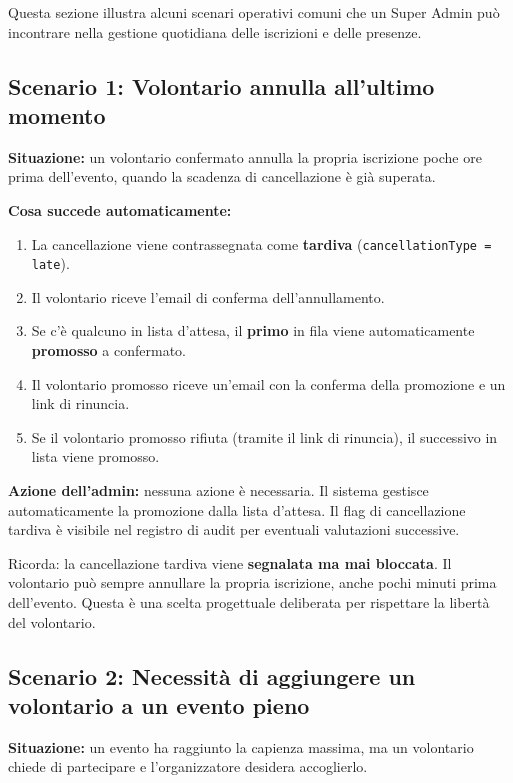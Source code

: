 \documentclass[a4paper,11pt,oneside]{book}
\newcommand{\campo}[1]{\texttt{#1}}
\begin{document}
Questa sezione illustra alcuni scenari operativi comuni che un Super Admin pu\`o incontrare nella gestione quotidiana delle iscrizioni e delle presenze.

\subsection{Scenario 1: Volontario annulla all'ultimo momento}

\textbf{Situazione:} un volontario confermato annulla la propria iscrizione poche ore prima dell'evento, quando la scadenza di cancellazione \`e gi\`a superata.

\textbf{Cosa succede automaticamente:}
\begin{enumerate}[leftmargin=1.5em]
  \item La cancellazione viene contrassegnata come \textbf{tardiva} (\campo{cancellationType = late}).
  \item Il volontario riceve l'email di conferma dell'annullamento.
  \item Se c'\`e qualcuno in lista d'attesa, il \textbf{primo} in fila viene automaticamente \textbf{promosso} a confermato.
  \item Il volontario promosso riceve un'email con la conferma della promozione e un link di rinuncia.
  \item Se il volontario promosso rifiuta (tramite il link di rinuncia), il successivo in lista viene promosso.
\end{enumerate}

\textbf{Azione dell'admin:} nessuna azione \`e necessaria. Il sistema gestisce automaticamente la promozione dalla lista d'attesa. Il flag di cancellazione tardiva \`e visibile nel registro di audit per eventuali valutazioni successive.

\begin{infobox}
Ricorda: la cancellazione tardiva viene \textbf{segnalata ma mai bloccata}. Il volontario pu\`o sempre annullare la propria iscrizione, anche pochi minuti prima dell'evento. Questa \`e una scelta progettuale deliberata per rispettare la libert\`a del volontario.
\end{infobox}

\subsection{Scenario 2: Necessit\`a di aggiungere un volontario a un evento pieno}

\textbf{Situazione:} un evento ha raggiunto la capienza massima, ma un volontario chiede di partecipare e l'organizzatore desidera accoglierlo.
\end{document}
